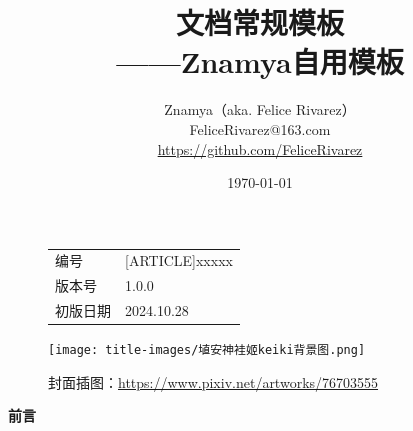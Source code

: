 \documentclass[UTF8,a4paper,12pt]{ctexart}
\begin{document}
\title{{\Huge{\textbf{文档常规模板}}}\\——Znamya自用模板}
\author{Znamya（aka. Felice Rivarez）\\FeliceRivarez@163.com\\ \url{https://github.com/FeliceRivarez}}
\date{\today}

\fancyhead[L]{\leftmark}%


\fancyhead[R]{\thepage}%


\begin{figure}[t]
\vspace{-6cm}
\begin{flushright}
    \begin{tabular}{|l|l|}
        编号&[ARTICLE]xxxxx\\
        版本号&1.0.0\\
        初版日期&2024.10.28\\
    \end{tabular}
\end{flushright}

\begin{center}
    \texttt{[image: title-images/埴安神袿姬keiki背景图.png]}
\end{center}
\maketitle
\begin{center}
\scriptsize
    封面插图：\url{https://www.pixiv.net/artworks/76703555}
\end{center}
\end{figure}
\thispagestyle{empty} %

\clearpage








\begin{center}
    \Large\textbf{前言}
\end{center}~\
\end{document}
